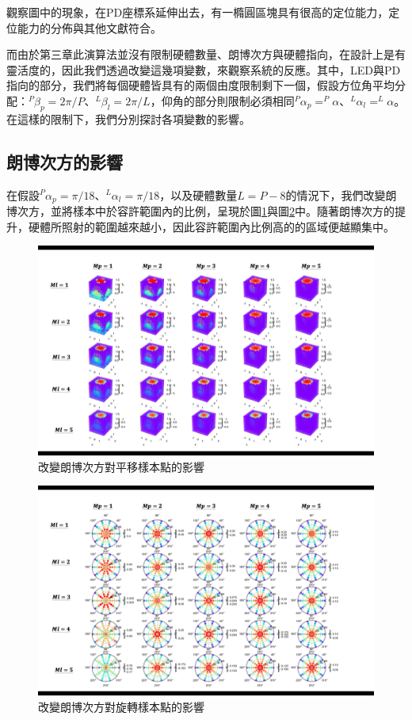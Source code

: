 觀察圖中的現象，在PD座標系延伸出去，有一橢圓區塊具有很高的定位能力，定位能力的分佈與其他文獻符合。

而由於第三章此演算法並沒有限制硬體數量、朗博次方與硬體指向，在設計上是有靈活度的，因此我們透過改變這幾項變數，來觀察系統的反應。其中，LED與PD指向的部分，我們將每個硬體皆具有的兩個由度限制剩下一個，假設方位角平均分配：$^P\beta_p = 2\pi/P$、$^L\beta_l = 2\pi/L$，仰角的部分則限制必須相同$^P\alpha_p =^P\alpha$、$^L\alpha_l = ^L\alpha$。在這樣的限制下，我們分別探討各項變數的影響。



\subsection{朗博次方的影響}

在假設$^P\alpha_p =\pi/18$、$^L\alpha_l = \pi/18$，以及硬體數量$L=P-8$的情況下，我們改變朗博次方，並將樣本中於容許範圍內的比例，呈現於圖\ref{pic:m_translate}與圖\ref{pic:m_rotate}中。隨著朗博次方的提升，硬體所照射的範圍越來越小，因此容許範圍內比例高的的區域便越顯集中。

\begin{figure}[h!]
    \centering
    \includegraphics[width=14cm]{ch4pic/m_translate.png}
    \caption{改變朗博次方對平移樣本點的影響}
    \label{pic:m_translate}
\end{figure}
\begin{figure}[h!]
    \centering
    \includegraphics[width=14cm]{ch4pic/m_rotate.png}
    \caption{改變朗博次方對旋轉樣本點的影響}
    \label{pic:m_rotate}
\end{figure}

